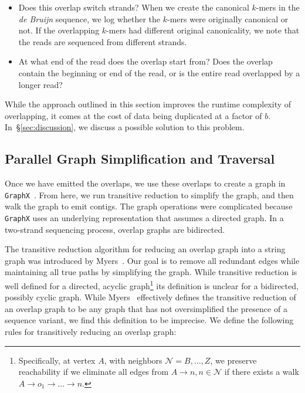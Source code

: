 \documentclass[11pt]{article}
\theoremstyle{plain}
\begin{document}
\begin{itemize}
\item Does this overlap switch strands? When we create the canonical $k$-mers in the \emph{de
Bruijn} sequence, we log whether the $k$-mers were originally canonical or not. If the
overlapping $k$-mers had different original canonicality, we note that the reads are sequenced
from different strands.
\item At what end of the read does the overlap start from? Does the overlap contain the
beginning or end of the read, or is the entire read overlapped by a longer read?
\end{itemize}

While the approach outlined in this section improves the runtime complexity of overlapping,
it comes at the cost of data being duplicated at a factor of $b$. In~\S\ref{sec:discussion},
we discuss a possible solution to this problem.

\subsection{Parallel Graph Simplification and Traversal}
\label{sec:graph-simplification-traversal}

Once we have emitted the overlaps, we use these overlaps to create a graph in
\texttt{GraphX}~\cite{gonzalez14, xin13}. From here, we run transitive reduction to simplify
the graph, and then walk the graph to emit contigs. The graph operations were complicated
because \texttt{GraphX} uses an underlying representation that assumes a directed graph.
In a two-strand sequencing process, overlap graphs are bidirected.

The transitive reduction algorithm for reducing an overlap graph into a string graph was
introduced by Myers~\cite{myers05}. Our goal is to remove all redundant edges while maintaining
all true paths by simplifying the graph. While transitive reduction is well defined for a
directed, acyclic graph\footnote{Specifically, at vertex $A$, with neighbors $\mathcal{N} =
B, \dots, Z$, we preserve reachability if we eliminate all edges from $A \rightarrow n, n \in
\mathcal{N}$ if there exists a walk $A \rightarrow o_1 \rightarrow \dots \rightarrow n$.}
its definition is unclear for a bidirected, possibly cyclic graph. While Myers~\cite{myers05}
effectively defines the transitive reduction of an overlap graph to be any graph that has not
oversimplified the presence of a sequence variant, we find this definition to be imprecise.
We define the following rules for transitively reducing an overlap graph:
\end{document}
